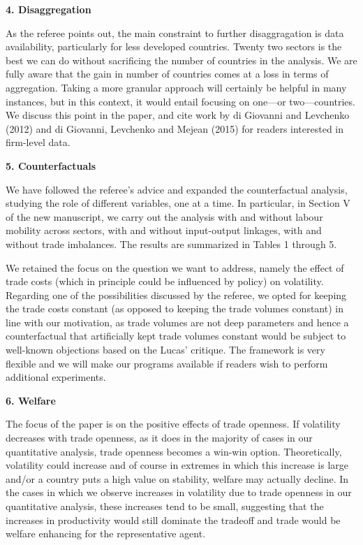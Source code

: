 \documentclass[12pt]{article}
\begin{document}
\textbf{4. Disaggregation}

As the referee points out, the main constraint to further disaggragation is
data availability, particularly for less developed countries. Twenty two
sectors is the best we can do without sacrificing the number of countries in
the analysis. We are fully aware that the gain in number of countries comes
at a loss in terms of aggregation. Taking a more granular approach will
certainly be helpful in many instances, but in this context, it would entail
focusing on one---or two---countries. We discuss this point in the paper,
and cite work by di Giovanni and Levchenko (2012) and di Giovanni, Levchenko
and Mejean (2015) for readers interested in firm-level data.\bigskip 

\textbf{5. Counterfactuals}

We have followed the referee's advice and expanded the counterfactual
analysis, studying the role of different variables, one at a time. In
particular, in Section V of the new manuscript, we carry out the analysis
with and without labour mobility across sectors, with and without
input-output linkages, with and without trade imbalances. The results are
summarized in Tables 1 through 5.

We retained the focus on the question we want to address, namely the effect
of trade costs (which in principle could be influenced by policy) on
volatility. Regarding one of the possibilities discussed by the referee, we
opted for keeping the trade costs constant (as opposed to keeping the trade
volumes constant) in line with our motivation, as trade volumes are not deep
parameters and hence a counterfactual that artificially kept trade volumes
constant would be subject to well-known objections based on the Lucas'
critique. The framework is very flexible and we will make our programs
available if readers wish to perform additional experiments.\bigskip 

\textbf{6. Welfare}

The focus of the paper is on the positive effects of trade openness. If
volatility decreases with trade openness, as it does in the majority of
cases in our quantitative analysis, trade openness becomes a win-win option.
Theoretically, volatility could increase and of course in extremes in which
this increase is large and/or a country puts a high value on stability,
welfare may actually decline. In the cases in which we observe increases in
volatility due to trade openness in our quantitative analysis, these
increases tend to be small, suggesting that the increases in productivity
would still dominate the tradeoff and trade would be welfare enhancing for
the representative agent.\bigskip
\end{document}
